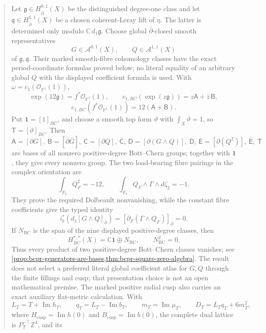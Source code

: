 \documentclass[11pt,letterpaper]{article}
\theoremstyle{definition}
\theoremstyle{remark}
\begin{document}
\begin{abstract}
Let \(\mathfrak g\in H_{\bar\partial}^{0,1}(X)\) be the distinguished
degree-one class and let \(\mathfrak q\in H_{\bar\partial}^{1,1}(X)\) be a
chosen coherent-Leray lift of \(\eta\).  The latter is determined only modulo
\(\mathbb C\,d_1\mathfrak g\).  Choose global \(\bar\partial\)-closed smooth
representatives
\[
 G\in\mathcal A^{0,1}(X),\qquad Q\in\mathcal A^{1,1}(X)
\]
of \(\mathfrak g,\mathfrak q\).  Their marked smooth-fibre cohomology classes
have the exact period-coordinate formulas proved below; no literal equality
of an arbitrary global \(Q\) with the displayed coefficient formula is used.
With \(\omega=c_1(\mathcal O_{\mathbb P^1}(1))\),
\[
 \exp(12\mathfrak g)=f^*\mathcal O_{\mathbb P^1}(1),\qquad
 c_{1,BC}(\exp(z\mathfrak g))=z\mathsf A+\bar z\,\mathsf B,
\]
\[
 c_{1,BC}(f^*\mathcal O_{\mathbb P^1}(1))
 =12(\mathsf A+\mathsf B).
\]
Put \(\mathbf1=[1]_{BC}\), and choose a smooth top form \(\vartheta\) with
\(\int_X\vartheta=1\), so \(\mathsf T=[\vartheta]_{BC}\).  Then
\[
 \mathsf A=[\partial G],\ \mathsf B=[\bar\partial\bar G],\
 \mathsf C=[\partial Q],\ \overline{\mathsf C},\
 \mathsf D=[\partial(G\wedge Q)],\ \overline{\mathsf D},\
 \mathsf E=[\partial(Q^2)],\ \overline{\mathsf E},\ \mathsf T
\]
are bases of all nonzero positive-degree Bott--Chern groups; together with
\(\mathbf1\), they give every nonzero group.  The two load-bearing fibre
pairings in the complex orientation are
 \[
  \int_{F_b}Q_F^2=-12,\qquad
  \int_{F_b}Q_F\wedge\Gamma\wedge d\zeta_2=-1.
 \]
They prove the required Dolbeault nonvanishing, while the constant fibre
coefficients give the typed identity
\[
 i_b^*\!\left(d_1[G\wedge Q]_{\bar\partial}\right)
 =[\partial_F(\Gamma\wedge Q_F)]_{\bar\partial}=0.
\]
If \(N_{\mathrm{BC}}\) is the span of the nine displayed positive-degree
classes, then
\[
 H^{*,*}_{BC}(X)=\mathbb C\mathbf1\oplus N_{\mathrm{BC}},\qquad
 N_{\mathrm{BC}}^2=0.
\]
Thus every product of two positive-degree Bott--Chern classes vanishes; see
\cref{prop:bcpr-generators-are-bases,thm:bcpr-square-zero-algebra}.  The
 result does not select a preferred literal global coefficient atlas for
 \(G,Q\) through the finite fillings and cusp; that presentation choice is not
 an open mathematical premise.
 The marked positive radial cusp also carries an exact auxiliary flat-metric
 calculation.  With
 \[
  L_T=T+\operatorname{Im}h_T,\qquad
  q_T=L_T-\operatorname{Im}b_T,\qquad
  m_T=\operatorname{Im}\mu_T,\qquad
  D_T=L_Tq_T+6m_T^2,
 \]
 where
 \(H_{\mathrm{cusp}}=\operatorname{Im}h(0)\) and
 \(B_{\mathrm{cusp}}=\operatorname{Im}b(0)\),
 the complete dual lattice is \(P_T^{-\top}\mathbb Z^4\), and its

\end{abstract}
\end{document}
